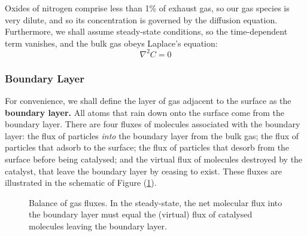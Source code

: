 \documentclass[12pt, a4paper, twoside, openright]{book}
\newcommand{\Finc}{\ensuremath{F_{\mathrm{inc}}}}
\newcommand{\Fads}{\ensuremath{F_{\mathrm{ads}}}}
\newcommand{\Fdes}{\ensuremath{F_{\mathrm{des}}}}
\newcommand{\Fcat}{\ensuremath{F_{\mathrm{cat}}}}
\begin{document}
Oxides of nitrogen comprise less than 1\% of exhaust gas, so our gas species is very dilute, and so its concentration is governed by the diffusion equation.  Furthermore, we shall assume steady-state conditions, so the time-dependent term vanishes, and the bulk gas obeys Laplace's equation:
\begin{equation}
\nabla^2 C = 0
\end{equation}


\subsubsection{Boundary Layer}

For convenience, we shall define the layer of gas adjacent to the surface as the \textbf{boundary layer.}  All atoms that rain down onto the surface come from the boundary layer. There are four fluxes of molecules associated with the boundary layer: the flux of particles \emph{into} the boundary layer from the bulk gas; the flux of particles that adsorb to the surface; the flux of particles that desorb from the surface before being catalysed; and the virtual flux of molecules destroyed by the catalyst, that leave the boundary layer by ceasing to exist. These fluxes are illustrated in the schematic of Figure (\ref{catalystfluxes}).

\begin{figure}[ht]
\centering
{}
\caption{Balance of gas fluxes.  In the steady-state, the net molecular flux into the boundary layer must equal the (virtual) flux of catalysed molecules leaving the boundary layer.}\label{catalystfluxes}
\end{figure}
\end{document}
